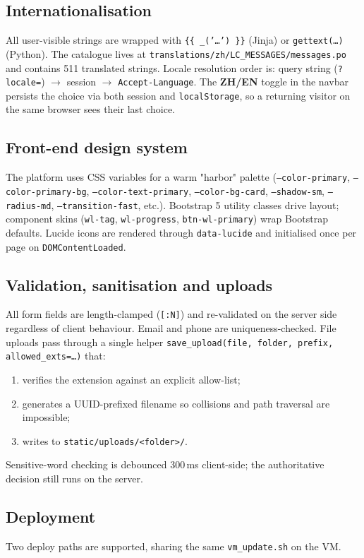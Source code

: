 \subsection{Internationalisation}
All user-visible strings are wrapped with \texttt{\{\{ \_('…') \}\}}
(Jinja) or \texttt{gettext(…)} (Python). The catalogue lives at
\texttt{translations/zh/LC\_MESSAGES/messages.po} and contains 511
translated strings. Locale resolution order is: query string
(\texttt{?locale=}) $\to$ session $\to$ \texttt{Accept-Language}. The
\textbf{ZH/EN} toggle in the navbar persists the choice via both session
and \texttt{localStorage}, so a returning visitor on the same browser
sees their last choice.

\subsection{Front-end design system}
The platform uses CSS variables for a warm "harbor" palette
(\texttt{--color-primary}, \texttt{--color-primary-bg},
\texttt{--color-text-primary}, \texttt{--color-bg-card},
\texttt{--shadow-sm}, \texttt{--radius-md},
\texttt{--transition-fast}, etc.). Bootstrap 5 utility classes drive
layout; component skins (\texttt{wl-tag}, \texttt{wl-progress},
\texttt{btn-wl-primary}) wrap Bootstrap defaults. Lucide icons are
rendered through \texttt{data-lucide} and initialised once per page on
\texttt{DOMContentLoaded}.

\subsection{Validation, sanitisation and uploads}
All form fields are length-clamped (\texttt{[:N]}) and re-validated on
the server side regardless of client behaviour. Email and phone are
uniqueness-checked. File uploads pass through a single helper
\texttt{save\_upload(file, folder, prefix, allowed\_exts=…)} that:
\begin{enumerate}
  \item verifies the extension against an explicit allow-list;
  \item generates a UUID-prefixed filename so collisions and path
        traversal are impossible;
  \item writes to \texttt{static/uploads/<folder>/}.
\end{enumerate}
Sensitive-word checking is debounced 300\,ms client-side; the
authoritative decision still runs on the server.

\subsection{Deployment}
Two deploy paths are supported, sharing the same \texttt{vm\_update.sh}
on the VM.

